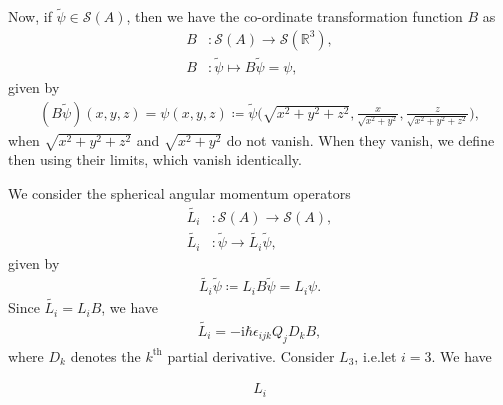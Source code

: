 \documentclass[12pt, a4 paper]{article}
\theoremstyle{definition}
\newcommand{\position}{Q}
\newcommand{\rr}{\mathbb{R}}
\newcommand{\schwartz}{\mathcal{S}}
\newcommand{\schwartzrthree}{\schwartz(\rr^3)}
\renewcommand{\i}{\mathrm{i}}
\newcommand{\levi}{\epsilon_{ijk}}
\begin{document}
	Now, if $\tilde{\psi} \in \schwartz(A)$, then we have the co-ordinate transformation function $B$ as
	\begin{align*}
	    B &\colon \schwartz(A) \rightarrow \schwartzrthree,\\
		B &\colon \tilde{\psi} \mapsto B\tilde{\psi} = \psi,
	\end{align*}
	given by
	\begin{align*}
		(B\tilde{\psi})(x, y, z) = \psi(x,y,z) \coloneq \tilde{\psi}\bigg(\sqrt{x^2 + y^2 + z^2}, \frac{x}{\sqrt{x^2 + y^2}}, \frac{z}{\sqrt{x^2 + y^2 + z^2}}\bigg),
	\end{align*}
	when $\sqrt{x^2 + y^2 + z^2}$ and $\sqrt{x^2 + y^2}$ do not vanish. When they vanish, we define then using their limits, which vanish identically.




	We consider the spherical angular momentum operators
	\begin{align*}
		\tilde{L_i} &\colon \schwartz(A) \rightarrow \schwartz(A),\\
		\tilde{L_i} &\colon \tilde{\psi} \rightarrow \tilde{L_i}\tilde{\psi},
	\end{align*}
	given by
	\begin{align*}
		\tilde{L_i}\tilde{\psi} \coloneq L_iB\tilde{\psi} = L_i\psi.
	\end{align*}
	Since $\tilde{L_i} = L_iB$, we have
	\begin{align*}
		\tilde{L_i} = -\i\hbar\levi\position_jD_kB,
	\end{align*}
	where $D_k$ denotes the $k^\text{th}$ partial derivative.
	Consider $L_3$, i.e.\@ let $i = 3$. We have









	\begin{align*}
	    L_i
	\end{align*}
\end{document}
